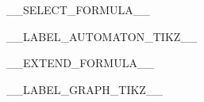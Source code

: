 \noindent\begin{minipage}[t]{0.6\textwidth}
\begingroup
\setlength{\textwidth}{\linewidth}
\begin{center}
__SELECT_FORMULA__
\end{center}
\endgroup
\end{minipage}\hfill%
\noindent\begin{minipage}[t]{0.38\textwidth}
__LABEL_AUTOMATON_TIKZ__
\end{minipage}

\noindent\begin{minipage}[t]{0.6\textwidth}
\begingroup
\setlength{\textwidth}{\linewidth}
\begin{center}
__EXTEND_FORMULA__
\end{center}
\endgroup
\end{minipage}\hfill%
\noindent\begin{minipage}[t]{0.38\textwidth}
__LABEL_GRAPH_TIKZ__
\end{minipage}
